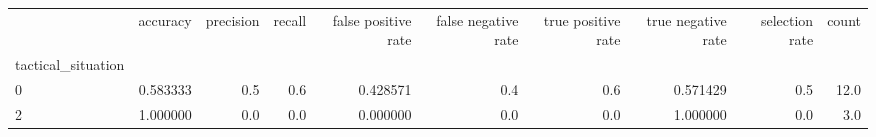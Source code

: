 \begin{tabular}{lrrrrrrrrr}
\toprule
{} &  accuracy &  precision &  recall &  false positive rate &  false negative rate &  true positive rate &  true negative rate &  selection rate &  count \\
tactical\_situation &           &            &         &                      &                      &                     &                     &                 &        \\
\midrule
0                  &  0.583333 &        0.5 &     0.6 &             0.428571 &                  0.4 &                 0.6 &            0.571429 &             0.5 &   12.0 \\
2                  &  1.000000 &        0.0 &     0.0 &             0.000000 &                  0.0 &                 0.0 &            1.000000 &             0.0 &    3.0 \\
\bottomrule
\end{tabular}
